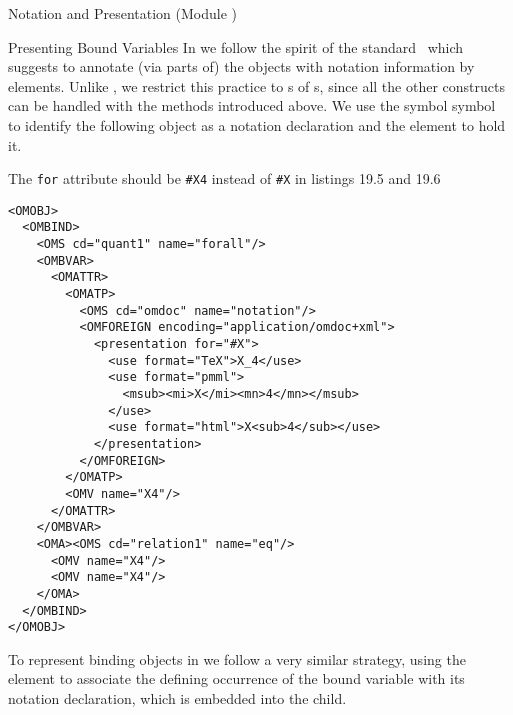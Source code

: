 \begin{tchapter}[id=pres,short=Notation and Presentation]{Notation and Presentation (Module {})}
\begin{tsection}[id=pres-bound]{Presenting Bound Variables}
  In {\omdoc} we follow the spirit of the {\openmath} standard~\cite{BusCapCar:2oms04}
  which suggests to annotate (via {} parts of) the {\openmath}
  objects with notation information by {} elements. Unlike
  {\openmath}, we restrict this practice to {s} of
  {s}, since all the other constructs can be handled with the
  methods introduced above.  We use the symbol {} symbol to identify the following object as a notation
  declaration and the {} element to hold it.

\begin{erratum}[reported-by=Alberto Gonzales Palomo,date=2006-10-06]{The {\texttt{for}}
    attribute should be {\texttt{\#X4}} instead of {\texttt{\#X}} in listings 19.5 and 19.6}
\begin{lstlisting}[language=OpenMath,label=lst:notation-om,
    caption={Notation for Bound Variables in {\openmath}},
    index={OMOBJ,OMBIND,OMS,OMBVAR,OMV,OMATTR,OMATP}]
<OMOBJ>                            
  <OMBIND>                          
    <OMS cd="quant1" name="forall"/> 
    <OMBVAR>                         
      <OMATTR>                        
        <OMATP>                        
          <OMS cd="omdoc" name="notation"/>
          <OMFOREIGN encoding="application/omdoc+xml">
            <presentation for="#X"> 
              <use format="TeX">X_4</use>
              <use format="pmml">
                <msub><mi>X</mi><mn>4</mn></msub>
              </use>
              <use format="html">X<sub>4</sub></use>
            </presentation>
          </OMFOREIGN>
        </OMATP>
        <OMV name="X4"/>                
      </OMATTR>                        
    </OMBVAR>
    <OMA><OMS cd="relation1" name="eq"/>
      <OMV name="X4"/>
      <OMV name="X4"/>
    </OMA>
  </OMBIND>                         
</OMOBJ>
\end{lstlisting}
  To represent binding objects in {\cmathml} we follow a very similar strategy, using the
  {} element to associate the defining occurrence of the
  bound variable with its notation declaration, which is embedded into the
  {} child.


\end{erratum}
\end{tsection}
\end{tchapter}
